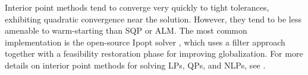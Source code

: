 \documentclass[../root.tex]{subfiles}
\begin{document}
    Interior point methods tend to converge very quickly to tight tolerances, exhibiting 
    quadratic convergence near the solution. However, they tend to be less amenable to 
    warm-starting than SQP or ALM. The most common implementation is the open-source 
    Ipopt solver \cite{wachter_Implementation_2006}, which uses a filter approach together 
    with a feasibility restoration phase for improving globalization. For more details on
    interior point methods for solving LPs, QPs, and NLPs, see 
    \cite{nocedal_Numerical_2006}.
\end{document}

